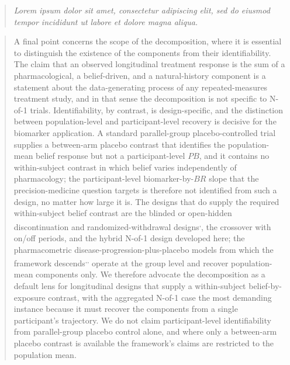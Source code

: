\documentclass[
  11pt,
]{article}
\newenvironment{rgt}{%
  \begin{quote}\small\itshape\color[RGB]{20,60,160}}{%
  \end{quote}}
\newenvironment{orig}{%
  \begin{quote}\normalsize\color[gray]{0.55}}{%
  \end{quote}}
\begin{document}
\begin{rgt}
Lorem ipsum dolor sit amet, consectetur adipiscing elit, sed do eiusmod tempor incididunt ut labore et dolore magna aliqua.

\end{rgt}

\begin{orig}
A final point concerns the scope of the decomposition, where it is
essential to distinguish the existence of the components from their
identifiability. The claim that an observed longitudinal treatment
response is the sum of a pharmacological, a belief-driven, and a
natural-history component is a statement about the data-generating
process of any repeated-measures treatment study, and in that sense the
decomposition is not specific to N-of-1 trials. Identifiability, by
contrast, is design-specific, and the distinction between
population-level and participant-level recovery is decisive for the
biomarker application. A standard parallel-group placebo-controlled
trial supplies a between-arm placebo contrast that identifies the
population-mean belief response but not a participant-level \(PB\), and it
contains no within-subject contrast in which belief varies independently
of pharmacology; the participant-level biomarker-by-\(BR\) slope that the
precision-medicine question targets is therefore not identified from
such a design, no matter how large it is. The designs that do supply the
required within-subject belief contrast are the blinded or open-hidden
discontinuation and randomized-withdrawal designs\textsuperscript{,}, the crossover with on/off periods, and
the hybrid N-of-1 design developed here; the pharmacometric
disease-progression-plus-placebo models from which the framework
descends\textsuperscript{,,} operate at the group
level and recover population-mean components only. We therefore advocate
the decomposition as a default lens for longitudinal designs that supply
a within-subject belief-by-exposure contrast, with the aggregated N-of-1
case the most demanding instance because it must recover the components
from a single participant's trajectory. We do not claim participant-level
identifiability from parallel-group placebo control alone, and where only
a between-arm placebo contrast is available the framework's claims are
restricted to the population mean.

\end{orig}
\end{document}

